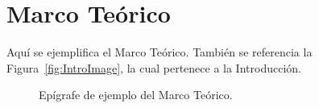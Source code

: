   \section{Marco Teórico}
    Aquí se ejemplifica el Marco Teórico. También se referencia la Figura~\ref{fig:IntroImage},
    la cual pertenece a la Introducción.
    
    \begin{figure}[ht]
      \centering
      \caption{Epígrafe de ejemplo del Marco Teórico.}
      \label{fig:MarcTeoImage}
  \end{figure}

